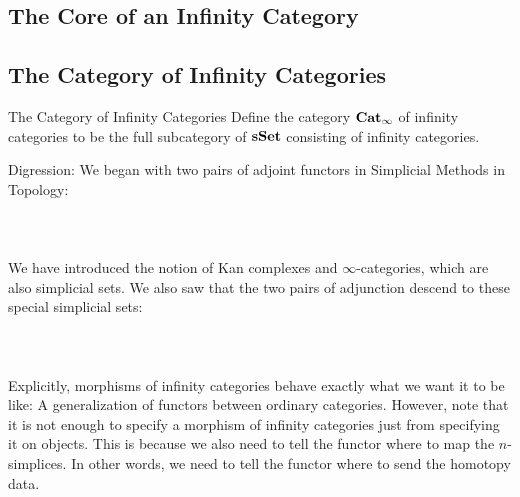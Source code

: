 \documentclass[a4paper]{article}
\begin{document}
\subsection{The Core of an Infinity Category}

\subsection{The Category of Infinity Categories}
\begin{defn}{The Category of Infinity Categories}{} Define the category $\bold{Cat}_\infty$ of infinity categories to be the full subcategory of $\bold{sSet}$ consisting of infinity categories. 
\end{defn}

Digression: We began with two pairs of adjoint functors in Simplicial Methods in Topology: \\~\\
\\~\\
We have introduced the notion of Kan complexes and $\infty$-categories, which are also simplicial sets. We also saw that the two pairs of adjunction descend to these special simplicial sets: \\~\\
\\~\\

Explicitly, morphisms of infinity categories behave exactly what we want it to be like: A generalization of functors between ordinary categories. However, note that it is not enough to specify a morphism of infinity categories just from specifying it on objects. This is because we also need to tell the functor where to map the $n$-simplices. In other words, we need to tell the functor where to send the homotopy data. 
\end{document}
